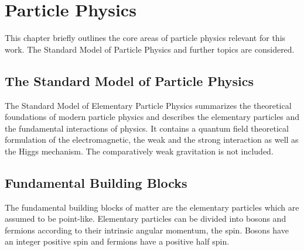 \documentclass[12pt, a4paper]{thesis}
\begin{document}

\chapter{Particle Physics}
\label{sec:orgcd2d7c7}

This chapter briefly outlines the core areas of particle
physics relevant for this work. The Standard Model of
Particle Physics and further topics are considered.

\section{The Standard Model of Particle Physics}
\label{sec:org862e92f}

The Standard Model of Elementary Particle Physics summarizes the
theoretical foundations of modern particle physics and describes the
elementary particles and the fundamental interactions of physics. It
contains a quantum field theoretical formulation of the
electromagnetic, the weak and the strong interaction as well as the
Higgs mechanism. The comparatively weak gravitation is not included.

\section{Fundamental Building Blocks}
\label{sec:org4008fdf}

The fundamental building blocks of matter are the elementary particles
which are assumed to be point-like. Elementary particles can be
divided into bosons and fermions according to their intrinsic angular
momentum, the spin. Bosons have an integer positive spin and fermions
have a positive half spin.
\end{document}
